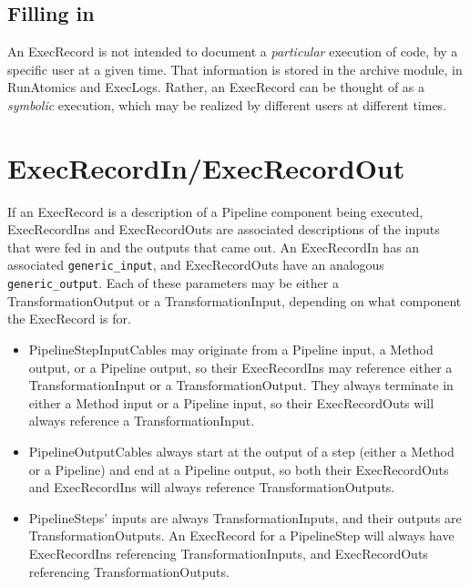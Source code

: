 \documentclass[12pt]{article}
\newcommand{\code}[1]{\texttt{#1}}
\begin{document}
\subsection*{Filling in}

An ExecRecord is not intended to document a \emph{particular} execution of
code, by a specific user at a given time. That information is stored in the
archive module, in RunAtomics and ExecLogs. Rather, an ExecRecord can be
thought of as a \emph{symbolic} execution, which may be realized by different
users at different times. 


\section*{ExecRecordIn/ExecRecordOut}

If an ExecRecord is a description of a Pipeline component being executed,
ExecRecordIns and ExecRecordOuts are associated descriptions of the inputs that
were fed in and the outputs that came out. An ExecRecordIn has an associated
\code{generic\_input}, and ExecRecordOuts have an analogous
\code{generic\_output}. Each of these parameters may be either a
TransformationOutput or a TransformationInput, depending on what component the
ExecRecord is for. 

\begin{itemize}
  \item PipelineStepInputCables may originate from a Pipeline input, a Method
    output, or a Pipeline output, so their ExecRecordIns may reference either a
    TransformationInput or a TransformationOutput. They always terminate in
    either a Method input or a Pipeline input, so their ExecRecordOuts will
    always reference a TransformationInput. 
  \item PipelineOutputCables always start at the output of a step (either a
    Method or a Pipeline) and end at a Pipeline output, so both their
    ExecRecordOuts and ExecRecordIns will always reference
    TransformationOutputs.
  \item PipelineSteps' inputs are always TransformationInputs, and their
    outputs are TransformationOutputs. An ExecRecord for a PipelineStep will
    always have ExecRecordIns referencing TransformationInputs, and
    ExecRecordOuts referencing TransformationOutputs.
\end{itemize}
\end{document}
